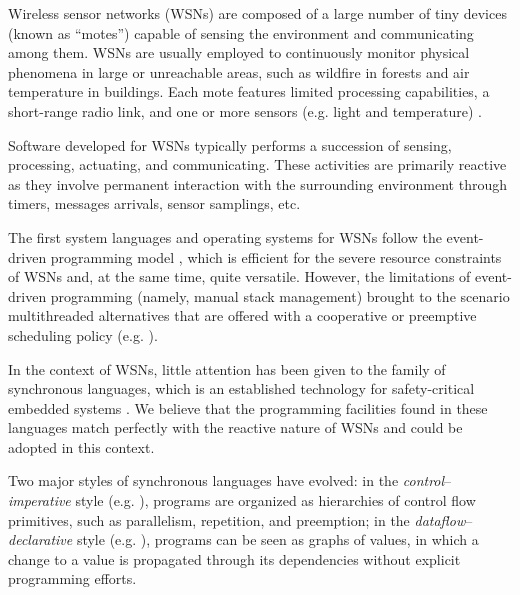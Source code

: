 \documentclass{sig-alternate-ipsn09}
\newcommand{\2}{\;\;}
\newcommand{\5}{\;\;\;\;\;}
\begin{document}
Wireless sensor networks (WSNs) are composed of a large number of tiny devices 
(known as ``motes'') capable of sensing the environment and communicating among 
them.
WSNs are usually employed to continuously monitor physical phenomena in large 
or unreachable areas, such as wildfire in forests and air temperature in 
buildings.
Each mote features limited processing capabilities, a short-range radio link, 
and one or more sensors (e.g. light and temperature) \cite{wsn.survey}.

Software developed for WSNs typically performs a succession of sensing, 
processing, actuating, and communicating.
These activities are primarily reactive as they involve permanent interaction 
with the surrounding environment through timers, messages arrivals, sensor 
samplings, etc.

The first system languages and operating systems for WSNs follow the 
event-driven programming model \cite{wsn.tos,wsn.contiki}, which is efficient 
for the severe resource constraints of WSNs and, at the same time, quite 
versatile.
However, the limitations of event-driven programming (namely, manual stack 
management) brought to the scenario multithreaded alternatives that are offered 
with a cooperative or preemptive scheduling policy (e.g.  
\cite{wsn.protothreads,wsn.mantisos}).

In the context of WSNs, little attention has been given to the family of 
synchronous languages, which is an established technology for safety-critical 
embedded systems \cite{rp.twelve}.
We believe that the programming facilities found in these languages match 
perfectly with the reactive nature of WSNs and could be adopted in this 
context.

Two major styles of synchronous languages have evolved:
in the \emph{control}--\emph{imperative} style (e.g. \cite{esterel.design}), 
programs are organized as hierarchies of control flow primitives, such as 
parallelism, repetition, and preemption;
in the \emph{dataflow}--\emph{declarative} style (e.g. \cite{lustre.ieee91}), 
programs can be seen as graphs of values, in which a change to a value is 
propagated through its dependencies without explicit programming efforts.
\end{document}
